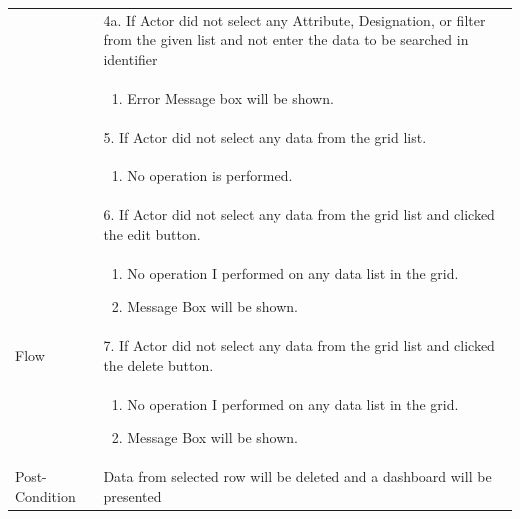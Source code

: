 \documentclass[12pt,a4paper]{article}
\begin{document}
\begin{longtable}{| p{3cm}|p{12cm}|}
& 4a. If Actor did not select any Attribute, Designation, or filter from the given list and not enter the data to be searched in identifier \\
& \begin{enumerate}
		\item Error Message box will be shown.
	\end{enumerate}
\\  
& 5. If Actor did not select any data from the grid list.  \\
& \begin{enumerate}
		\item No operation is performed.
	\end{enumerate}
\\ 
& 6. If Actor did not select any data from the grid list and clicked the edit button.\\
& \begin{enumerate}
		\item No operation I performed on any data list in the grid.
            \item Message Box will be shown.
	\end{enumerate}
\\
Flow       & 7. If Actor did not select any data from the grid list and clicked the delete button.\\
 	&\begin{enumerate}
			\item No operation I performed on any data list in the grid.
            \item Message Box will be shown.
	\end{enumerate}
\\ \hline 


Post-Condition &  Data from selected row will be deleted and a dashboard will be presented  \\ \hline

\end{longtable}

\end{document}
